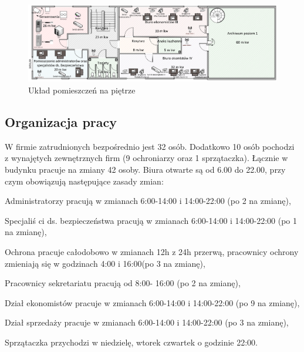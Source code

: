\begin{landscape}
	\begin{figure}[!h]
		\vspace{3cm}
		\includegraphics[width=24cm]{uklad_pomieszczen_poziom1.png}
		\caption{Układ pomieszczeń na piętrze}
		\label{schemat:uklad_pomieszczen_poziom1}
	\end{figure}
\end{landscape}

\newpage
\subsection{Organizacja pracy}
W firmie zatrudnionych bezpośrednio jest 32 osób. Dodatkowo 10 osób pochodzi z wynajętych zewnętrznych firm (9 ochroniarzy oraz 1 sprzątaczka). Łącznie w budynku pracuje na zmiany 42 osoby. Biura otwarte są od 6.00 do 22.00, przy czym obowiązują następujące zasady zmian:

\hspace{-0.5cm}\begin{minipage}{13.5cm}
	\begin{itemize*}
		\item Administratorzy pracują w zmianach 6:00-14:00 i 14:00-22:00 \linebreak (po 2 na zmianę),
		\item Specjaliś	ci ds. bezpieczeństwa pracują w zmianach 6:00-14:00 i 14:00-22:00  (po 1 na zmianę),
		\item Ochrona pracuje całodobowo w zmianach 12h z 24h przerwą, pracownicy ochrony zmieniają się w godzinach 4:00 i 16:00(po 3 na zmianę),
		\item Pracownicy sekretariatu pracują od 8:00- 16:00 (po 2 na zmianę),
		\item Dział ekonomistów pracuje w zmianach 6:00-14:00 i 14:00-22:00 \linebreak (po 9 na zmianę),
		\item Dział sprzedaży pracuje w zmianach 6:00-14:00 i 14:00-22:00 \linebreak (po 3 na zmianę),
		\item Sprzątaczka przychodzi w niedzielę, wtorek czwartek o godzinie 22:00.
	\end{itemize*}
\end{minipage}

